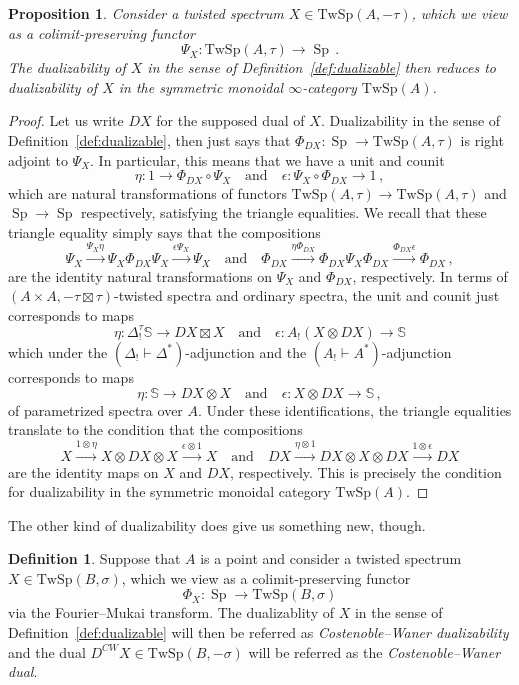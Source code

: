 \documentclass[10pt]{amsart}
\newcommand{\longto}{\longrightarrow}
\theoremstyle{plain}
\newtheorem{proposition}[theorem]{Proposition}
\theoremstyle{definition}
\newtheorem{definition}[theorem]{Definition}
\DeclareMathOperator{\Sp}{Sp}
\newcommand{\bS}{\mathbb{S}}
\newcommand{\TwSp}{\mathrm{TwSp}}
\newcommand{\och}{\quad \text{and} \quad}
\begin{document}
\begin{proposition}
  Consider a twisted spectrum $X \in \TwSp(A,-\tau)$, which we view as a colimit-preserving functor
  \[
  \Psi_X : \TwSp(A,\tau) \longto \Sp \,.
  \]
  The dualizability of $X$ in the sense of Definition~\ref{def:dualizable} then reduces to dualizability of $X$ in the symmetric monoidal $\infty$-category $\TwSp(A)$.
\end{proposition}

\begin{proof}
  Let us write $D X$ for the supposed dual of $X$.
  Dualizability in the sense of Definition~\ref{def:dualizable}, then just says that $\Phi_{DX} : \Sp \to \TwSp(A,\tau)$ is right adjoint to $\Psi_X$.
  In particular, this means that we have a unit and counit
  \[
  \eta : 1 \to \Phi_{DX} \circ \Psi_{X} \och \epsilon : \Psi_X \circ \Phi_{DX} \to 1 \,,
  \]
  which are natural transformations of functors $\TwSp(A,\tau) \to \TwSp(A,\tau)$ and $\Sp \to \Sp$ respectively, satisfying the triangle equalities. We recall that these triangle equality simply says that the compositions
  \[
  \Psi_X \overset{\Psi_X \eta}\to \Psi_X \Phi_{DX} \Psi_X \overset{\epsilon \Psi_{X}}\to \Psi_X \och \Phi_{DX} \overset{\eta \Phi_{DX}}\to \Phi_{DX} \Psi_X \Phi_{DX} \overset{\Phi_{DX} \epsilon}\to \Phi_{DX} \,,
  \]
  are the identity natural transformations on $\Psi_X$ and $\Phi_{DX}$, respectively.
  In terms of $(A \times A , -\tau \boxtimes \tau)$-twisted spectra and ordinary spectra, the unit and counit just corresponds to maps
  \[
  \eta : \Delta_{!}^\tau \bS \to DX \boxtimes X \och \epsilon : A_!(X \otimes DX) \to \bS
  \]
  which under the $(\Delta_! \vdash \Delta^{*})$-adjunction and the $(A_! \vdash A^*)$-adjunction corresponds to maps
  \[
  \eta : \bS \to DX \otimes X \och \epsilon : X \otimes DX \to \bS \,,
  \]
  of parametrized spectra over $A$.
  Under these identifications, the triangle equalities translate to the condition that the  compositions
  \[
  X \overset{1 \otimes \eta}\to X \otimes DX \otimes X \overset{\epsilon \otimes 1}\to X \och DX \overset{\eta \otimes 1}\to DX \otimes X \otimes DX \overset{1 \otimes \epsilon}\to DX
  \]
  are the identity maps on $X$ and $DX$, respectively. This is precisely the condition for dualizability in the symmetric monoidal category $\TwSp(A)$.
\end{proof}

The other kind of dualizability does give us something new, though.

\begin{definition}
  Suppose that $A$ is a point and consider a twisted spectrum $X \in \TwSp(B,\sigma)$, which we view as a colimit-preserving functor
  \[
  \Phi_X : \Sp \to \TwSp(B,\sigma)
  \]
  via the Fourier--Mukai transform.
  The dualizablity of $X$ in the sense of Definition~\ref{def:dualizable} will then be referred as \emph{Costenoble--Waner dualizability} and the dual $D^{CW} X \in \TwSp(B,-\sigma)$ will be referred as the \emph{Costenoble--Waner dual}.
\end{definition}
\end{document}
